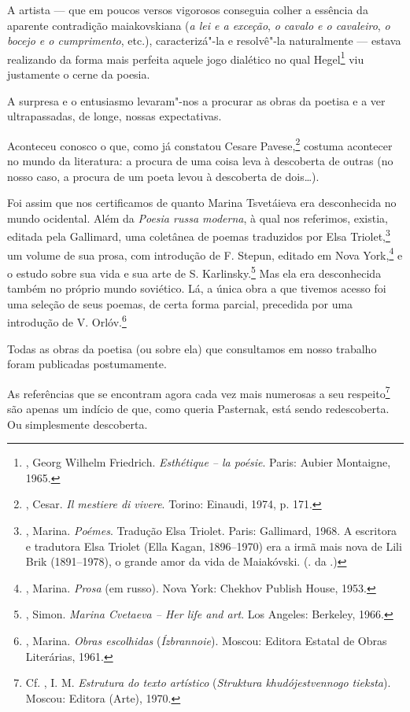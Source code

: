 A artista --- que em poucos versos vigorosos conseguia colher a
essência da aparente contradição maiakovskiana (\emph{a lei e a
exceção}, \emph{o cavalo e o cavaleiro}, \emph{o bocejo e o
cumprimento}, etc.), caracterizá"-la e resolvê"-la naturalmente
--- estava realizando da forma mais perfeita aquele jogo dialético
no qual Hegel\footnote{, Georg Wilhelm Friedrich.
\emph{Esthétique -- la poésie}. Paris: Aubier Montaigne, 1965.}
viu justamente o cerne da poesia.

A surpresa e o entusiasmo levaram"-nos a procurar as obras da
poetisa e a ver ultrapassadas, de longe, nossas expectativas.

Aconteceu conosco o que, como já constatou Cesare
Pavese,\footnote{, Cesar. \emph{Il mestiere di
vivere}. Torino: Einaudi, 1974, p. 171.} costuma acontecer no
mundo da literatura: a procura de uma coisa leva à descoberta
de outras (no nosso caso, a procura de um poeta levou à
descoberta de dois\ldots{}).

Foi assim que nos certificamos de quanto Marina Tsvetáieva era
desconhecida no mundo ocidental. Além da \emph{Poesia russa
moderna}, à qual nos referimos, existia, editada pela Gallimard,
uma coletânea de poemas traduzidos por Elsa Triolet,\footnote{,
Marina. \emph{Poémes}. Tradução Elsa Triolet. Paris: Gallimard,
1968. A escritora e tradutora Elsa Triolet (Ella Kagan, 1896--1970) era a irmã mais nova de Lili Brik (1891--1978), o grande amor da vida de Maiakóvski. (. da .)} um volume de sua prosa, com introdução de F. Stepun, editado em Nova York,\footnote{, Marina.
\emph{Prosa} (em russo). Nova York: Chekhov Publish House,
1953.} e o estudo sobre sua vida e sua arte de S.
Karlinsky.\footnote{, Simon. \emph{Marina
Cvetaeva -- Her life and art}. Los Angeles: Berkeley, 1966.} Mas
ela era desconhecida também no próprio mundo soviético. Lá, a
única obra a que tivemos acesso foi uma seleção de seus poemas,
de certa forma parcial, precedida por uma introdução de
V. Orlóv.\footnote{, Marina. \emph{Obras
escolhidas} (\emph{Ízbrannoie}). Moscou: Editora Estatal de
Obras Literárias, 1961.}

Todas as obras da poetisa (ou sobre ela) que consultamos em nosso
trabalho foram publicadas postumamente.

As referências que se encontram agora cada vez mais numerosas a seu
respeito\footnote{Cf. , I. M. \emph{Estrutura do
texto artístico} (\emph{Struktura khudójestvennogo tieksta}). Moscou:
Editora (Arte), 1970.} são apenas um indício de que, como queria
Pasternak, está sendo redescoberta. Ou simplesmente descoberta.

